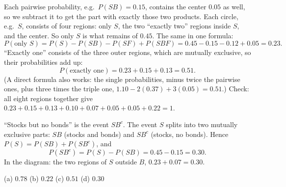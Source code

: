 \begin{solution}
	\medskip
	Each pairwise probability, e.g.\ $P(SB)=0.15$, contains the center
	$0.05$ as well, so we subtract it to get the part with exactly those two
	products. Each circle, e.g.\ $S$, consists of four regions: only $S$, the
	two ``exactly two'' regions inside $S$, and the center. So only $S$ is what
	remains of $0.45$. The same in one formula:
	\[ P(\text{only }S)=P(S)-P(SB)-P(SF)+P(SBF)=0.45-0.15-0.12+0.05=0.23. \]
	``Exactly one'' consists of the three outer regions, which are mutually
	exclusive, so their probabilities add up:
	\[ P(\text{exactly one})=0.23+0.15+0.13=0.51. \]
	(A direct formula also works: the single probabilities, minus twice the
	pairwise ones, plus three times the triple one,
	$1.10-2(0.37)+3(0.05)=0.51$.)
	Check: all eight regions together give
	$0.23+0.15+0.13+0.10+0.07+0.05+0.05+0.22=1$.

	 ``Stocks but no bonds'' is the event $SB^c$. The event $S$ splits
	into two mutually exclusive parts: $SB$ (stocks and bonds) and $SB^c$
	(stocks, no bonds). Hence $P(S)=P(SB)+P(SB^c)$, and
	\[ P(SB^c)=P(S)-P(SB)=0.45-0.15=0.30. \]
	In the diagram: the two regions of $S$ outside $B$, $0.23+0.07=0.30$.
	\begin{answer}
		(a) $0.78$ \quad (b) $0.22$ \quad (c) $0.51$ \quad (d) $0.30$
	\end{answer}
\end{solution}
